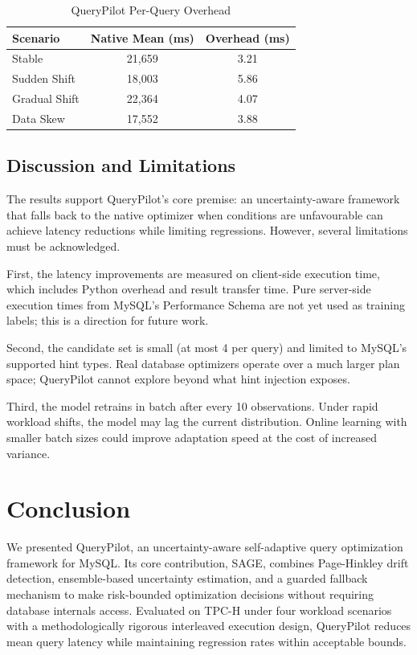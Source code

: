 \documentclass[conference]{IEEEtran}
\begin{document}
\begin{table}[htbp]
\centering
\caption{QueryPilot Per-Query Overhead}
\renewcommand{\arraystretch}{1.3}
\begin{tabular}{|l|c|c|}
\hline
\textbf{Scenario} & \textbf{Native Mean (ms)} & \textbf{Overhead (ms)} \\
\hline
Stable        & 21,659 & 3.21 \\
Sudden Shift  & 18,003 & 5.86 \\
Gradual Shift & 22,364 & 4.07 \\
Data Skew     & 17,552 & 3.88 \\
\hline
\end{tabular}
\label{tab:overhead}
\end{table}

\subsection*{Discussion and Limitations}

The results support QueryPilot's core premise: an uncertainty-aware
framework that falls back to the native optimizer when conditions are
unfavourable can achieve latency reductions while limiting regressions.
However, several limitations must be acknowledged.

First, the latency improvements are measured on client-side execution time,
which includes Python overhead and result transfer time. Pure server-side
execution times from MySQL's Performance Schema are not yet used as training
labels; this is a direction for future work.

Second, the candidate set is small (at most 4 per query) and limited to
MySQL's supported hint types. Real database optimizers operate over a much
larger plan space; QueryPilot cannot explore beyond what hint injection
exposes.

Third, the model retrains in batch after every 10 observations. Under rapid
workload shifts, the model may lag the current distribution. Online learning
with smaller batch sizes could improve adaptation speed at the cost of
increased variance.

\section{Conclusion}

We presented QueryPilot, an uncertainty-aware self-adaptive query
optimization framework for MySQL. Its core contribution, SAGE, combines
Page-Hinkley drift detection, ensemble-based uncertainty estimation, and a
guarded fallback mechanism to make risk-bounded optimization decisions
without requiring database internals access. Evaluated on TPC-H under four
workload scenarios with a methodologically rigorous interleaved execution
design, QueryPilot reduces mean query latency while maintaining regression
rates within acceptable bounds.
\end{document}
